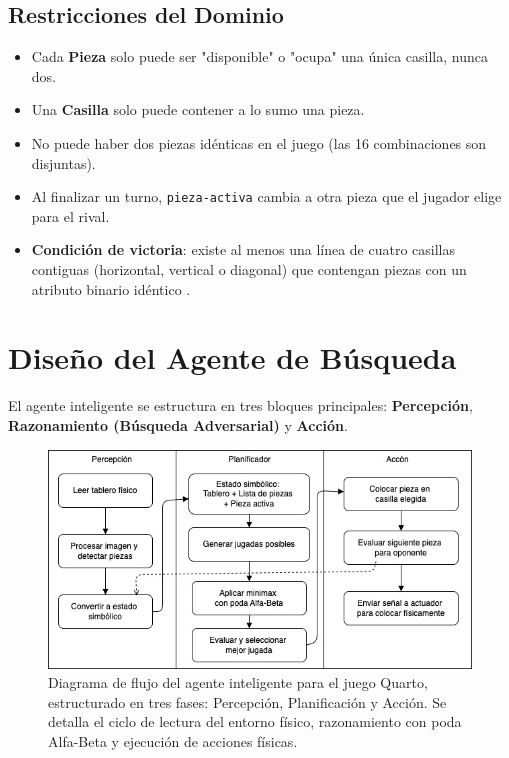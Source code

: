 \documentclass[conference]{IEEEtran}
\begin{document}
\subsection{Restricciones del Dominio}

\begin{itemize}
\item Cada \textbf{Pieza} solo puede ser "disponible" o "ocupa" una única casilla, nunca dos.
\item Una \textbf{Casilla} solo puede contener a lo sumo una pieza.
\item No puede haber dos piezas idénticas en el juego (las 16 combinaciones son disjuntas).
\item Al finalizar un turno, \texttt{pieza-activa} cambia a otra pieza que el jugador elige para el rival.
\item \textbf{Condición de victoria}: existe al menos una línea de cuatro casillas contiguas (horizontal, vertical o diagonal) que contengan piezas con un atributo binario idéntico \cite{muller2009}.
\end{itemize}

\section{Diseño del Agente de Búsqueda}

El agente inteligente se estructura en tres bloques principales: \textbf{Percepción}, \textbf{Razonamiento (Búsqueda Adversarial)} y \textbf{Acción}.


\begin{figure}[h!]
	\centering
	\includegraphics[width=0.95\linewidth]{img/diagrama-busqueda.png}
	\caption{Diagrama de flujo del agente inteligente para el juego Quarto, estructurado en tres fases: Percepción, Planificación y Acción. Se detalla el ciclo de lectura del entorno físico, razonamiento con poda Alfa-Beta y ejecución de acciones físicas.}
	\label{fig:diagrama_busqueda}
\end{figure}
\end{document}
